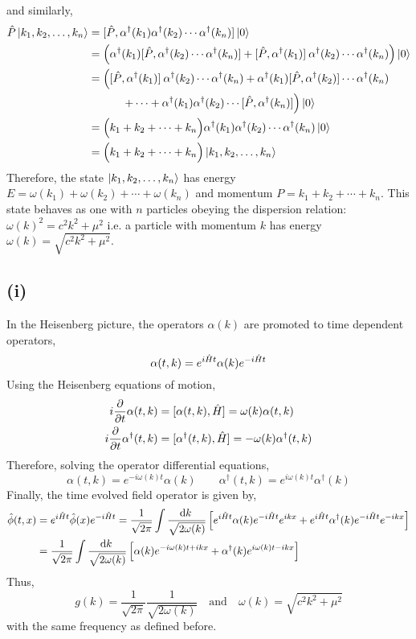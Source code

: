 \documentclass[12pt]{extarticle}
\begin{document}
and similarly,  
\begin{align*}
\hat{P} \left| k_1, k_2, \dots, k_n \right> & = [\hat{P}, \alpha^\dagger(k_1) \alpha^\dagger(k_2) \cdots \alpha^\dagger(k_n)] \left| 0 \right> 
\\
& = \left( \alpha^\dagger(k_1) [\hat{P}, \alpha^\dagger(k_2) \cdots \alpha^\dagger(k_n)]   + [\hat{P}, \alpha^\dagger(k_1)] \: \alpha^\dagger(k_2) \cdots \alpha^\dagger(k_n) \right) \left| 0 \right> 
\\
& = \left([\hat{P}, \alpha^\dagger(k_1)] \: \alpha^\dagger(k_2) \cdots \alpha^\dagger(k_n) + \alpha^\dagger(k_1) [\hat{P}, \alpha^\dagger(k_2)] \cdots \alpha^\dagger(k_n) \right. \\ 
& \left. \quad \quad \quad + \cdots +  \alpha^\dagger(k_1) \alpha^\dagger(k_2) \cdots [\hat{P}, \alpha^\dagger(k_n)] \right) \left| 0 \right> 
\\ 
& = \Big( k_1 + k_2 + \cdots + k_n \Big) \alpha^\dagger(k_1) \alpha^\dagger(k_2) \cdots \alpha^\dagger(k_n) \left| 0 \right> 
\\
& = \Big( k_1 + k_2 + \cdots + k_n \Big) \left| k_1, k_2, \dots, k_n \right>
\end{align*}
Therefore, the state $\left| k_1, k_2, \dots, k_n \right>$ has energy $E = \omega(k_1) + \omega(k_2) + \cdots + \omega(k_n)$ and momentum $P = k_1 + k_2 + \cdots + k_n$. This state behaves as one with $n$ particles obeying the dispersion relation: $\omega(k)^2 = c^2 k^2 + \mu^2$ i.e. a particle with momentum $k$ has energy $\omega(k) = \sqrt{c^2 k^2 + \mu^2}$.
 
\subsection*{(i)}

In the Heisenberg picture, the operators $\alpha(k)$ are promoted to time dependent operators, 
\[\alpha(t, k) = e^{i \hat{H} t} \alpha(k) e^{- i \hat{H} t} \]
Using the Heisenberg equations of motion,
\begin{align*}
i \frac{\partial{}}{\partial{t}} \alpha(t, k) & = [\alpha(t, k), \hat{H}] = \omega(k) \alpha(t, k) \\
i \frac{\partial{}}{\partial{t}} \alpha^\dagger(t, k) & = [\alpha^\dagger(t, k), \hat{H}] = - \omega(k) \alpha^\dagger(t, k) 
\end{align*}
Therefore, solving the operator differential equations,
\[ \alpha(t, k) = e^{- i \omega(k) t} \alpha(k) \quad \quad \alpha^\dagger(t, k) = e^{i \omega(k) t} \alpha^\dagger(k)\]
Finally, the time evolved field operator is given by,
\begin{align*}
\hat{\phi}(t, x) & = e^{i \hat{H} t} \hat{\phi}(x) e^{- i \hat{H} t} = \frac{1}{\sqrt{2\pi}} \int \frac{\mathrm{d}k \:}{\sqrt{2 \omega(k)}} \left[ e^{i \hat{H} t} \alpha(k) e^{- i \hat{H} t} e^{i k x} + e^{i \hat{H} t} \alpha^\dagger(k) e^{- i \hat{H} t} e^{- i k x} \right] 
\\
& = \frac{1}{\sqrt{2\pi}} \int \frac{\mathrm{d}k \:}{\sqrt{2 \omega(k)}} \left[ \alpha(k) e^{- i \omega(k) t + i k x} + \alpha^\dagger(k) e^{i \omega(k) t - i k x} \right]
\end{align*}
Thus, 
\[g(k) = \frac{1}{\sqrt{2 \pi}} \frac{1}{\sqrt{2 \omega(k)}} \quad \text{and} \quad \omega(k) = \sqrt{c^2 k^2 + \mu^2}\]
with the same frequency as defined before. 
\end{document}
